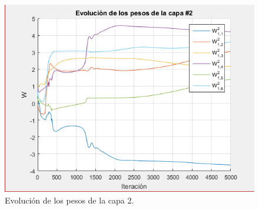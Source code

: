 \documentclass[12pt, titlepage]{article}
\begin{document}
\begin{figure}[H]
    \begin{center}
        \includegraphics[width=12cm]{1/pesos2.png}
        \caption{Evolución de los pesos de la capa 2.}
        \label{fig:pesos2}
    \end{center}
\end{figure}
\end{document}
